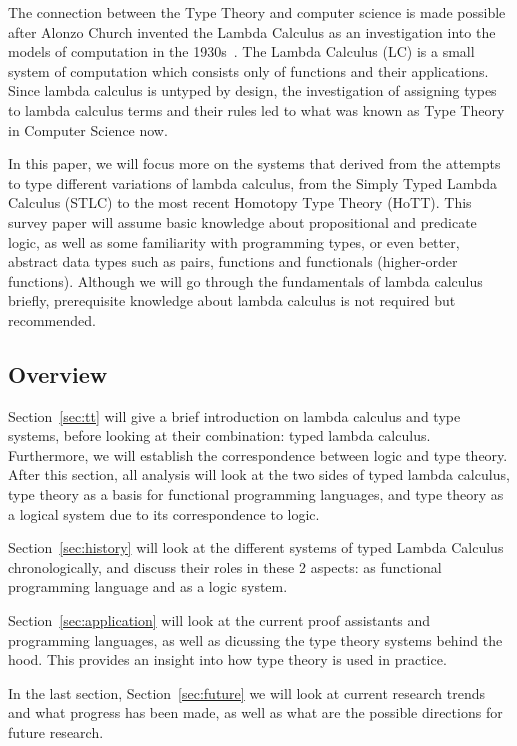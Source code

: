 \documentclass[acmsmall]{acmart}
\begin{document}
The connection between the Type Theory and computer science is made possible
after Alonzo Church invented the Lambda Calculus as an investigation into the
models of computation in the 1930s~\cite{church1932postulates}. The Lambda
Calculus (LC) is a small system of computation which consists only of functions
and their applications. Since lambda calculus is untyped by design, the
investigation of assigning types to lambda calculus terms and their rules led to
what was known as Type Theory in Computer Science now.

In this paper, we will focus more on the systems that derived from the attempts
to type different variations of lambda calculus, from the Simply Typed Lambda
Calculus (STLC) to the most recent Homotopy Type Theory (HoTT). This survey
paper will assume basic knowledge about propositional and predicate logic, as
well as some familiarity with programming types, or even better, abstract data
types such as pairs, functions and functionals (higher-order functions).
Although we will go through the fundamentals of lambda calculus briefly,
prerequisite knowledge about lambda calculus is not required but recommended.

\subsection{Overview}

Section~\ref{sec:tt} will give a brief introduction on lambda calculus and type
systems, before looking at their combination: typed lambda calculus.
Furthermore, we will establish the correspondence between logic and type theory.
After this section, all analysis will look at the two sides of typed lambda
calculus, type theory as a basis for functional programming languages, and type
theory as a logical system due to its correspondence to logic.

Section~\ref{sec:history} will look at the different systems of typed Lambda Calculus
chronologically, and discuss their roles in these 2 aspects: as functional
programming language and as a logic system.

Section~\ref{sec:application} will look at the current proof assistants and programming
languages, as well as dicussing the type theory systems behind the hood. This
provides an insight into how type theory is used in practice.

In the last section, Section~\ref{sec:future} we will look at current research
trends and what progress has been made, as well as what are the possible
directions for future research.
\end{document}
